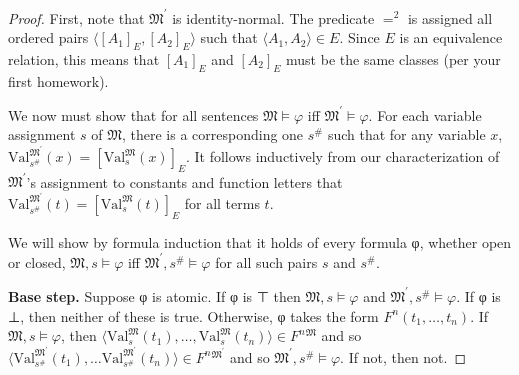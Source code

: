 \documentclass[12pt]{report}
\theoremstyle{nonumberplain}
\newtheorem{proof}{Proof}
\newcommand{\M}{\mathfrak{M}}
\newcommand{\Val}{\mathrm{Val}}
\newcommand{\ValMs}{\Val^{\M}_{s}}
\begin{document}
\begin{proof}
First, note that $\M^{\prime}$ is identity-normal. The predicate $=^2$ is assigned all ordered pairs $⟨[A_1]_E, [A_2]_E⟩$ such that $⟨A_1, A_2⟩ ∈ E$. Since $E$ is an equivalence relation, this means that $[A_1]_E$ and $[A_2]_E$ must be the same classes (per your first homework).

We now must show that for all sentences $\M ⊨ φ$ iff $\M^{\prime} ⊨ φ$. For each variable assignment $s$ of $\M$, there is a corresponding one $s^{\#}$ such that for any variable $x$, $\Val^{\M^{\prime}}_{s^{\#}}(x) = [\ValMs(x)]_E$. It follows inductively from our characterization of $\M^\prime$'s assignment to constants and function letters that  $\Val^{\M^{\prime}}_{s^{\#}}(t) = [\ValMs(t)]_E$ for all terms $t$.


We will show by formula induction that it holds of every formula φ, whether open or closed, $\M, s ⊨ φ$ iff $\M^{\prime}, s^{\#} ⊨ φ$ for all such pairs $s$ and $s^{\#}$.

\medskip\noindent \textbf{Base step.} Suppose φ is atomic. If φ is ⊤ then  $\M, s ⊨ φ$ and $\M^{\prime}, s^{\#} ⊨ φ$. If φ is ⊥, then neither of these is true. Otherwise, φ takes the form $F^n(t_1, \dotsc, t_n)$. If $\M, s ⊨ φ$, then $⟨\ValMs(t_1), \dotsc, \ValMs(t_n)⟩ ∈ F^n{}^{\M}$ and so $⟨\Val^{\M^{\prime}}_{s^{\#}}(t_1), \dotsc \Val^{\M^{\prime}}_{s^{\#}}(t_n)⟩ ∈ F^n{}^{\M^\prime}$ and so $\M^{\prime}, s^{\#} ⊨ φ$. If not, then not.


\end{proof}
\end{document}
